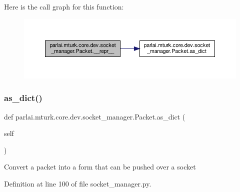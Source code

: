 Here is the call graph for this function\+:
\nopagebreak
\begin{figure}[H]
\begin{center}
\leavevmode
\includegraphics[width=350pt]{classparlai_1_1mturk_1_1core_1_1dev_1_1socket__manager_1_1Packet_add796297ba2304710fade256bf5e0adf_cgraph}
\end{center}
\end{figure}
\mbox{\label{classparlai_1_1mturk_1_1core_1_1dev_1_1socket__manager_1_1Packet_a806382fb1c252d86229e9f846cfec6c9}} 
\subsubsection{\texorpdfstring{as\+\_\+dict()}{as\_dict()}}
{\footnotesize\ttfamily def parlai.\+mturk.\+core.\+dev.\+socket\+\_\+manager.\+Packet.\+as\+\_\+dict (\begin{DoxyParamCaption}\item[{}]{self }\end{DoxyParamCaption})}

\begin{DoxyVerb}Convert a packet into a form that can be pushed over a socket\end{DoxyVerb}
 

Definition at line 100 of file socket\+\_\+manager.\+py.



